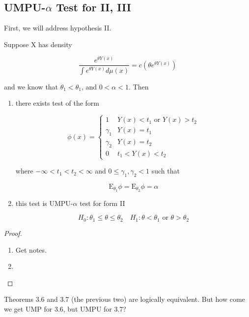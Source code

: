 \documentclass[11pt,fleqn]{book} %
\newcommand{\E}{\mathrm{E}}
\begin{document}
 \subsection{UMPU-$\alpha$ Test for II, III}

 First, we will address hypothesis II. 

 \begin{theorem}[3.7]
 	Suppose X has density 

 			$$\frac{e^{\theta Y(x)}}{\int e^{\theta Y(x)} d\mu(x)} = c(\theta e^{\theta Y(x)}) $$

 	and we know that $\theta_1 < \theta_1$, and $0 < \alpha < 1$. Then

 			\begin{enumerate}
 				\item there exists test of the form 

 						$$\phi(x) = \left\{\begin{array}{ll}
 							1 & Y(x) < t_1 \text{ or } Y(x) > t_2\\
 							\gamma_1 & Y(x) = t_1\\
 							\gamma_2 & Y(x) = t_2 \\
 							0 & t_1 < Y(x) < t_2
 						\end{array} \right. $$

 			where $-\infty < t_1 < t_2 < \infty$ and $0 \leq \gamma_1, \gamma_2 < 1$ such that

 					$$\E_{\theta_1} \phi = \E_{\theta_2} \phi = \alpha  $$


				\item this test is UMPU-$\alpha$ test for form II

						$$H_0: \theta_1 \leq \theta \leq \theta_2 \quad H_1: \theta< \theta_1 \text{ or } \theta > \theta_2$$

 			\end{enumerate}
 \end{theorem}

\begin{proof}
	\begin{enumerate}
		
		\item Get notes. 

		\item 

	\end{enumerate}
\end{proof}

Theorems 3.6 and 3.7 (the previous two) are logically equivalent. But how come we get UMP for 3.6, but UMPU for 3.7?
\end{document}
